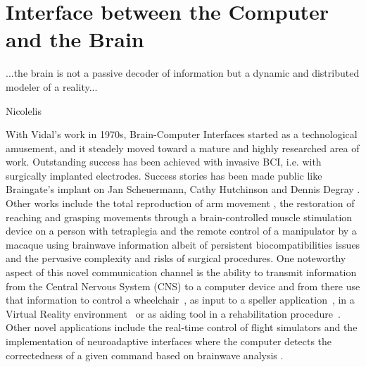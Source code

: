 \chapter{Interface between the Computer and the Brain}
\label{chapter:one}

\epigraph{...the brain is not a passive decoder of information but a dynamic and distributed modeler of a reality...}{Nicolelis}


\vspace{10px}




With Vidal's work in 1970s, Brain-Computer Interfaces started as a technological amusement, and it steadely moved toward a mature and highly researched area of work.  Outstanding success has been achieved with invasive BCI, i.e. with surgically implanted electrodes. Success stories has been made public like Braingate's implant on Jan Scheuermann, Cathy Hutchinson and Dennis Degray \cite{Pandarinath2017}.  Other works include the total reproduction of arm movement \cite{c27}, the restoration of reaching and grasping movements through a brain-controlled muscle stimulation device on a person with tetraplegia \cite{Ajiboye2017} and the remote control of a manipulator by a macaque using brainwave information \cite{c29} albeit of persistent biocompatibilities issues and the pervasive complexity and risks of surgical procedures. One noteworthy aspect of this novel communication channel is the ability to transmit information from the Central Nervous System (CNS) to a computer device and from there use that information to control a wheelchair~\cite{Carlson2013}, as input to a speller application~\cite{Guger2009a}, in a Virtual Reality environment~\cite{Lotte2013} or as aiding tool in a rehabilitation procedure~\cite{Jure2016}.  Other novel applications include the real-time control of flight simulators \cite{Nourmohammadi2018} and the implementation of neuroadaptive interfaces where the computer detects the correctedness of a given command based on brainwave analysis \cite{Zander2016}.

